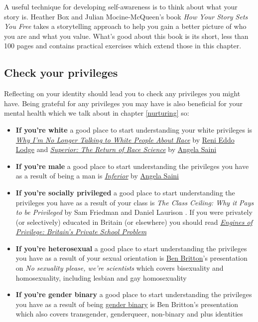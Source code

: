 \documentclass[
]{book}
\providecommand{\tightlist}{%
  \setlength{\itemsep}{0pt}\setlength{\parskip}{0pt}}
\begin{document}
A useful technique for developing self-awareness is to think about what your story is. Heather Box and Julian Mocine-McQueen's book \emph{How Your Story Sets You Free} \citep{freeyourstory} takes a storytelling approach to help you gain a better picture of who you are and what you value. What's good about this book is its short, less than 100 pages and contains practical exercises which extend those in this chapter.

\hypertarget{privileged}{%
\subsection{Check your privileges}\label{privileged}}

Reflecting on your identity should lead you to check any privileges you might have. Being grateful for any privileges you may have is also beneficial for your mental health which we talk about in chapter \ref{nurturing} so:

\begin{itemize}
\tightlist
\item
  \textbf{If you're white} a good place to start understanding your white privileges is \emph{\href{https://en.wikipedia.org/wiki/Why_I'm_No_Longer_Talking_to_White_People_About_Race}{Why I'm No Longer Talking to White People About Race}} by \href{https://en.wikipedia.org/wiki/Reni_Eddo-Lodge}{Reni Eddo Lodge} \citep{nottalking} and \emph{\href{https://en.wikipedia.org/wiki/Superior:_The_Return_of_Race_Science}{Superior: The Return of Race Science}} by \href{https://en.wikipedia.org/wiki/Angela_Saini}{Angela Saini}
\item
  \textbf{If you're male} a good place to start understanding the privileges you have as a result of being a man is \emph{\href{https://en.wikipedia.org/wiki/Inferior_(book)}{Inferior}} by \href{https://en.wikipedia.org/wiki/Angela_Saini}{Angela Saini} \citep{inferior}
\item
  \textbf{If you're socially privileged} a good place to start understanding the privileges you have as a result of your class is \emph{The Class Ceiling: Why it Pays to be Privileged} by Sam Friedman and Daniel Laurison \citep{classceiling}. If you were privately (or selectively) educated in Britain (or elsewhere) you should read \emph{\href{https://en.wikipedia.org/wiki/Engines_of_Privilege}{Engines of Privilege: Britain's Private School Problem}} \citep{nicebutdim}
\item
  \textbf{If you're heterosexual} a good place to start understanding the privileges you have as a result of your sexual orientation is \href{https://en.wikipedia.org/wiki/Ben_Britton}{Ben Britton}'s presentation on \emph{No sexuality please, we're scientists} \citep{nosex} which covers bisexuality and homosexuality, including lesbian and gay homosexuality
\item
  \textbf{If you're gender binary} a good place to start understanding the privileges you have as a result of being \href{https://en.wikipedia.org/wiki/Gender_binary}{gender binary} is Ben Britton's presentation \citep{nosex} which also covers transgender, genderqueer, non-binary and plus identities
\end{itemize}
\end{document}
